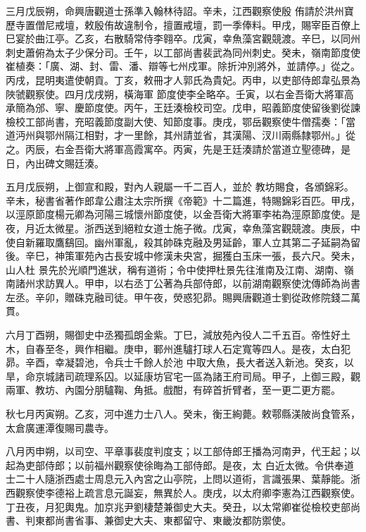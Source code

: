 \begin{pinyinscope}
 三月戊辰朔，命興唐觀道士孫準入翰林待詔。辛未，江西觀察使殷
 侑請於洪州寶歷寺置僧尼戒壇，敕殷侑故違制令，擅置戒壇，罰一季俸料。甲戌，賜宰臣百僚上巳宴於曲江亭。乙亥，右散騎常侍李翱卒。戊寅，幸魚藻宮觀競渡。辛巳，以同州刺史蕭俯為太子少保分司。壬午，以工部尚書裴武為同州刺史。癸未，嶺南節度使崔植奏：「廣、湖、封、雷、潘、辯等七州戍軍。除折沖別將外，並請停。」從之。丙戌，昆明夷遣使朝貢。丁亥，敕冊才人郭氏為貴妃。丙申，以吏部侍郎韋弘景為陜虢觀察使。四月戊戌朔，橫海軍
 節度使李全略卒。壬寅，以右金吾衛大將軍高承簡為邠、寧、慶節度使。丙午，王廷湊檢校司空。戊申，昭義節度使留後劉從諫檢校工部尚書，充昭義節度副大使、知節度事。庚戌，鄂岳觀察使牛僧孺奏：「當道沔州與鄂州隔江相對，才一里餘，其州請並省，其漢陽、汊川兩縣隸鄂州。」從之。丙辰，右金吾衛大將軍高霞寓卒。丙寅，先是王廷湊請於當道立聖德碑，是日，內出碑文賜廷湊。



 五月戊辰朔，上御宣和殿，對內人親屬一千二百人，並於
 教坊賜食，各頒錦彩。辛未，秘書省著作郎韋公肅注太宗所撰《帝範》十二篇進，特賜錦彩百匹。甲戌，以涇原節度楊元卿為河陽三城懷州節度使，以金吾衛大將軍李祐為涇原節度使。是夜，月近太微星。浙西送到絕粒女道士施子微。戊寅，幸魚藻宮觀競渡。庚辰，中使自新羅取鷹鷂回。幽州軍亂，殺其帥硃克融及男延齡，軍人立其第二子延嗣為留後。辛巳，神策軍苑內古長安城中修漢未央宮，掘獲白玉床一張，長六尺。癸未，山人杜
 景先於光順門進狀，稱有道術；令中使押杜景先往淮南及江南、湖南、嶺南諸州求訪異人。甲申，以右丞丁公著為兵部侍郎，以前湖南觀察使沈傳師為尚書左丞。辛卯，贈硃克融司徒。甲午夜，熒惑犯昴。賜興唐觀道士劉從政修院錢二萬貫。



 六月丁酉朔，賜御史中丞獨孤朗金紫。丁巳，減放苑內役人二千五百。帝性好土木，自春至冬，興作相繼。庚申，鄆州進驢打球人石定寬等四人。是夜，太白犯昴。辛酉，幸凝碧池，令兵士千餘人於池
 中取大魚，長大者送入新池。癸亥，以旱，命京城諸司疏理系囚。以延康坊官宅一區為諸王府司局。甲子，上御三殿，觀兩軍、教坊、內園分朋驢鞠、角抵。戲酣，有碎首折臂者，至一更二更方罷。



 秋七月丙寅朔。乙亥，河中進力士八人。癸未，衡王絢薨。敕鄠縣渼陂尚食管系，太倉廣運潭復賜司農寺。



 八月丙申朔，以司空、平章事裴度判度支；以工部侍郎王播為河南尹，代王起；以起為吏部侍郎；以前福州觀察使徐晦為工部侍郎。是夜，太
 白近太微。令供奉道士二十人隨浙西處士周息元入內宮之山亭院，上問以道術，言識張果、葉靜能。浙西觀察使李德裕上疏言息元誕妄，無異於人。庚戌，以太府卿李憲為江西觀察使。丁丑夜，月犯輿鬼。加京兆尹劉棲楚兼御史大夫。癸丑，以太常卿崔從檢校吏部尚書、判東都尚書省事、兼御史大夫、東都留守、東畿汝都防禦使。




\end{pinyinscope}
